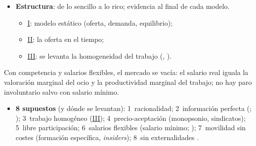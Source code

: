\documentclass{article}
\begin{document}
\begin{columnas}
\begin{itemize}
\begin{itemize}
  \item ¿Más horas si sube $w$? ¿Transitorio o permanente?
  \item ¿Por qué no todos cobran igual? ¿Rinde estudiar y cómo se mide?
  \end{itemize}
\item \textbf{Estructura}: de lo sencillo a lo rico; evidencia al final de cada modelo.
  \begin{itemize}
  \item \hyperref[rep:I]{I}: modelo estático (oferta, demanda, equilibrio);
  \item \hyperref[rep:II]{II}: la oferta en el tiempo;
  \item \hyperref[rep:III]{III}: se levanta la homogeneidad del trabajo (, ).
  \end{itemize}
\end{itemize}

\begin{ideaclave}
Con competencia y salarios flexibles, el mercado se vacía: el salario real iguala la valoración marginal del ocio y la productividad marginal del trabajo; no hay paro involuntario salvo con salario mínimo.
\end{ideaclave}
\begin{itemize}
\item \textbf{8 supuestos} (y dónde se levantan): 1~racionalidad; 2~información perfecta (;  ); 3~trabajo homogéneo (\hyperref[rep:III]{III}); 4~precio-aceptación (monopsonio, sindicatos); 5~libre participación; 6~salarios flexibles (salario mínimo;  ); 7~movilidad sin costes (formación específica, \emph{insiders}); 8~sin externalidades .
\end{itemize}


\end{columnas}
\end{document}
